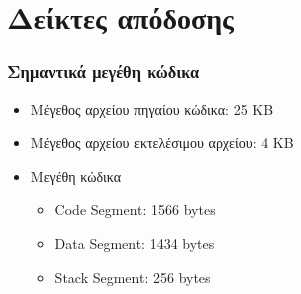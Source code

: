 \documentclass[10pt,a4paper]{article}
\begin{document}
\section*{Δείκτες απόδοσης}

\subsubsection*{Σημαντικά μεγέθη κώδικα}
\begin{itemize}
\item Μέγεθος αρχείου πηγαίου κώδικα: 25 \latintext KB \greektext
\item Μέγεθος αρχείου εκτελέσιμου αρχείου: 4 \latintext KB \greektext
\item Μεγέθη κώδικα
\latintext
	\begin{itemize}
	\item Code Segment: 1566 bytes
	\item Data Segment: 1434 bytes
	\item Stack Segment: 256 bytes
	\end{itemize}
\greektext
\end{itemize}
\end{document}
